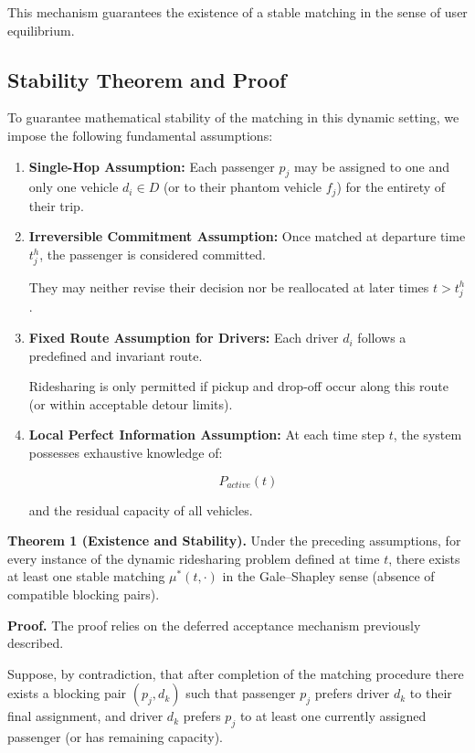 \documentclass[12pt, a4paper]{article}
\begin{document}
This mechanism guarantees the existence of a stable matching in the sense of user equilibrium.

\subsection{Stability Theorem and Proof}

To guarantee mathematical stability of the matching in this dynamic setting, we impose the following fundamental assumptions:

\begin{enumerate}

    \item \textbf{Single-Hop Assumption:}
    Each passenger $p_j$ may be assigned to one and only one vehicle $d_i\in D$ (or to their phantom vehicle $f_j$) for the entirety of their trip.

    \item \textbf{Irreversible Commitment Assumption:}
    Once matched at departure time $t_j^h$, the passenger is considered committed.

    They may neither revise their decision nor be reallocated at later times $t>t_j^h$.

    \item \textbf{Fixed Route Assumption for Drivers:}
    Each driver $d_i$ follows a predefined and invariant route.

    Ridesharing is only permitted if pickup and drop-off occur along this route (or within acceptable detour limits).

    \item \textbf{Local Perfect Information Assumption:}
    At each time step $t$, the system possesses exhaustive knowledge of:

$$
P_{active}(t)
$$

and the residual capacity of all vehicles.

\end{enumerate}

\textbf{Theorem 1 (Existence and Stability).}
Under the preceding assumptions, for every instance of the dynamic ridesharing problem defined at time $t$, there exists at least one stable matching $\mu^*(t,\cdot)$ in the Gale--Shapley sense (absence of compatible blocking pairs).

\textbf{Proof.}
The proof relies on the deferred acceptance mechanism previously described.

Suppose, by contradiction, that after completion of the matching procedure there exists a blocking pair $(p_j,d_k)$ such that passenger $p_j$ prefers driver $d_k$ to their final assignment, and driver $d_k$ prefers $p_j$ to at least one currently assigned passenger (or has remaining capacity).
\end{document}

